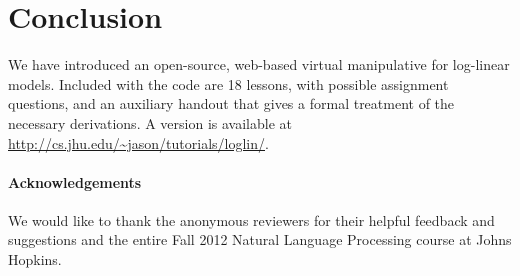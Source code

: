 \documentclass[11pt,letterpaper]{article}
\newcommand{\Note}[1]{}
\renewcommand{\Note}[1]{\hl{[#1]}}  %
\newcommand{\NoteSigned}[3]{{\sethlcolor{#2}\Note{#1: #3}}}
\newcommand{\NoteFF}[1]{\NoteSigned{FF}{LightBlue}{#1}}
\newcommand{\WhereToFind}[0]{\url{http://cs.jhu.edu/~jason/tutorials/loglin/}}
\newcommand{\NumLessons}[0]{18}%
\begin{document}

\section{Conclusion}
We have introduced an open-source, web-based virtual manipulative for
log-linear models. Included with the code are
\NumLessons{} lessons, with possible assignment questions, and an auxiliary handout that 
gives a formal treatment of the necessary derivations.
A version is available at \WhereToFind{}.


\paragraph*{Acknowledgements}
We would like to thank the anonymous reviewers for their helpful feedback and suggestions 
and the entire Fall 2012 Natural Language Processing course at 
Johns Hopkins.




\end{document}
